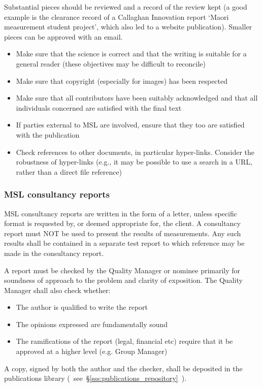 Substantial pieces should be reviewed and a record of the review kept (a good example is the clearance record of a Callaghan Innovation report `Maori measurement student project', which also led to a website publication). Smaller pieces can be approved with an email.

\begin{itemize}
\item Make sure that the science is correct and that the writing is suitable for a general reader (these objectives may be difficult to reconcile)
\item Make sure that copyright (especially for images) has been respected
\item Make sure that all contributors have been suitably acknowledged and that all individuals concerned are satisfied with the final text 
\item If parties external to MSL are involved, ensure that they too are satisfied with the publication
\item Check references to other documents, in particular hyper-links. Consider the robustness of hyper-links (e.g., it may be possible to use a search in a URL, rather than a direct file reference) 
\end{itemize}
\subsubsection{MSL consultancy reports}
MSL consultancy reports are written in the form of a letter, unless specific format is requested by, or deemed appropriate for, the client.
A consultancy report must NOT be used to present the results of measurements. Any such results shall be contained in a separate test report to which reference may be made in the consultancy report.

A report must be checked by the Quality Manager or nominee primarily for soundness of approach to the problem and clarity of exposition. The Quality Manager shall also check whether: 
\begin{itemize}
\item  The author is qualified to write the report
\item  The opinions expressed are fundamentally sound
\item  The ramifications of the report (legal, financial etc) require that it be approved at a higher level (e.g. Group Manager)
\end{itemize}
A copy, signed by both the author and the checker, shall be deposited in the publications library (~see~\S\ref{sss:publications_repository}~). 


